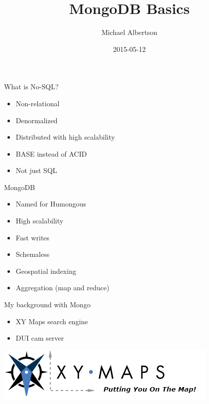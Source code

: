 \documentclass{beamer}
\title{MongoDB Basics}
\author{Michael Albertson}
\date{2015-05-12}
\begin{document}
\begin{frame}

\maketitle

\end{frame}


\begin{frame}{What is No-SQL?}

\begin{itemize}
\item Non-relational
\item Denormalized
\item Distributed with high scalability
\item BASE instead of ACID %
\item Not just SQL
\end{itemize}

\end{frame}


\begin{frame}{MongoDB}

\begin{itemize}
\item Named for Humongous
\item High scalability
\item Fast writes
\item Schemaless
\item Geospatial indexing
\item Aggregation (map and reduce)
\end{itemize}

\end{frame}


\begin{frame}{My background with Mongo}

\begin{itemize}
\item XY Maps search engine
\item DUI cam server
\end{itemize}

\includegraphics{xy-logo.png}

\end{frame}
\end{document}
